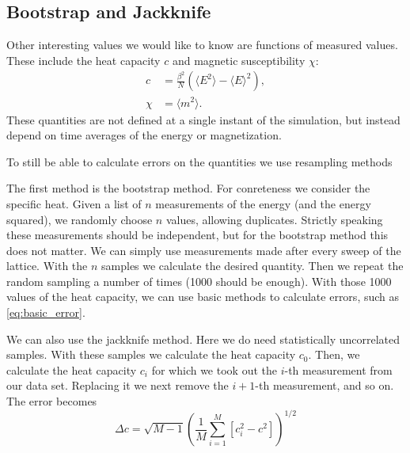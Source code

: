 \documentclass[11pt, a4paper]{report} %
\begin{document}
\subsection{Bootstrap and Jackknife}
Other interesting values we would like to know are functions of measured values.
These include the heat capacity \(c\) and magnetic susceptibility \(\chi\):
\begin{align}
	c &= \frac{\beta^2}{N} \left(\langle E^2 \rangle - \langle E \rangle^2 \right), \\
	\chi &= \langle m^2 \rangle.
\end{align}
These quantities are not defined at a single instant of the simulation, but instead depend on time averages of the energy or magnetization.

To still be able to calculate errors on the quantities we use resampling methods

The first method is the bootstrap method.
For conreteness we consider the specific heat.
Given a list of \(n\) measurements of the energy (and the energy squared), we randomly choose \(n\) values, allowing duplicates.
Strictly speaking these measurements should be independent, but for the bootstrap method this does not matter.
We can simply use measurements made after every sweep of the lattice.
With the \(n\) samples we calculate the desired quantity.
Then we repeat the random sampling a number of times (1000 should be enough).
With those 1000 values of the heat capacity, we can use basic methods to calculate errors, such as \cref{eq:basic_error}.\cite{newman:1999}

We can also use the jackknife method.
Here we do need statistically uncorrelated samples.
With these samples we calculate the heat capacity \(c_0\).
Then, we calculate the heat capacity \(c_i\) for which we took out the \(i\)-th measurement from our data set.
Replacing it we next remove the \(i+1\)-th measurement, and so on.\cite{newman:1999}
The error becomes\cite{corboz}
\begin{equation}
	\Delta c = \sqrt{M-1}\left( \frac{1}{M} \sum_{i=1}^M \left[c_i^2 - c^2\right] \right)^{1/2}
\end{equation}
\end{document}
